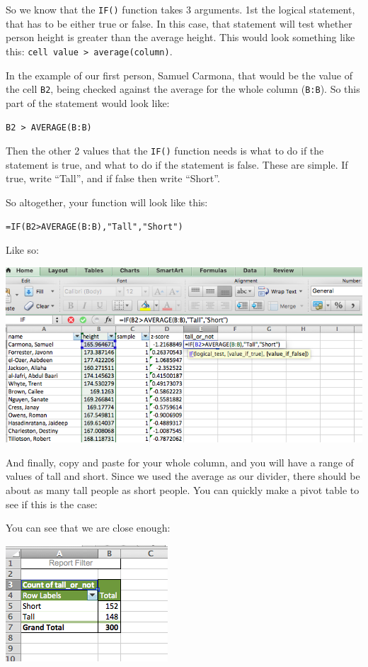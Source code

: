 \documentclass[
]{book}
\begin{document}
So we know that the \texttt{IF()} function takes 3 arguments. 1st the logical statement, that has to be either true or false. In this case, that statement will test whether person height is greater than the average height. This would look something like this: \texttt{cell\ value\ \textgreater{}\ average(column)}.

In the example of our first person, Samuel Carmona, that would be the value of the cell \texttt{B2}, being checked against the average for the whole column (\texttt{B:B}). So this part of the statement would look like:

\texttt{B2\ \textgreater{}\ AVERAGE(B:B)}

Then the other 2 values that the \texttt{IF()} function needs is what to do if the statement is true, and what to do if the statement is false. These are simple. If true, write ``Tall'', and if false then write ``Short''.

So altogether, your function will look like this:

\texttt{=IF(B2\textgreater{}AVERAGE(B:B),"Tall","Short")}

Like so:

\includegraphics{imgs/ifelse_tallshort.png}

And finally, copy and paste for your whole column, and you will have a range of values of tall and short. Since we used the average as our divider, there should be about as many tall people as short people. You can quickly make a pivot table to see if this is the case:

You can see that we are close enough:

\includegraphics{imgs/tallshort_pivot.png}
\end{document}

